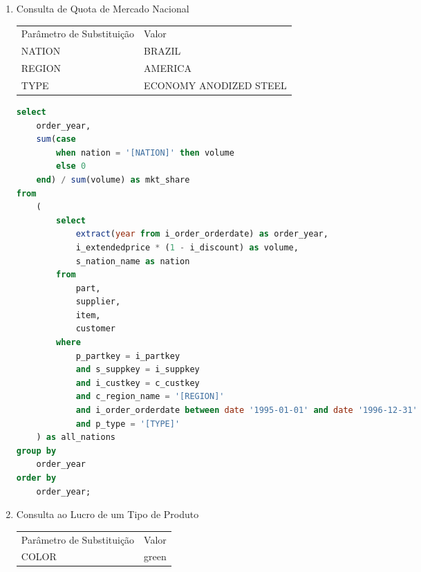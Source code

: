 \begin{enumerate}
	\begin{lstlisting}[language=SQL]
select
	supp_nation,
	cust_nation,
	i_year,
	sum(volume) as revenue
from
	(
		select
			s_nation_name as supp_nation,
			c_nation_name as cust_nation,
			extract(year from i_shipdate) as i_year,
			i_extendedprice * (1 - i_discount) as volume
		from
			supplier,
			item,
			customer,
		where
			s_suppkey = i_suppkey
			and c_custkey = i_custkey
			and (
				(s_nation_name = '[NATION1]' and c_nation_name = '[NATION2]')
				or (s_nation_name = '[NATION2]' and c_nation_name = '[NATION1]')
			)
			and i_shipdate between date '1995-01-01' and date '1996-12-31'
	) as shipping
group by
	supp_nation,
	cust_nation,
	i_year
order by
	supp_nation,
	cust_nation,
	i_year;
\end{lstlisting}

\item Consulta de Quota de Mercado Nacional

\begin{tabular}{ll}
	Parâmetro de Substituição & Valor\\
	NATION & BRAZIL\\
	REGION & AMERICA\\
	TYPE &  ECONOMY ANODIZED STEEL\\
\end{tabular}

	\begin{lstlisting}[language=SQL]
select
	order_year,
	sum(case
		when nation = '[NATION]' then volume
		else 0
	end) / sum(volume) as mkt_share
from
	(
		select
			extract(year from i_order_orderdate) as order_year,
			i_extendedprice * (1 - i_discount) as volume,
			s_nation_name as nation
		from
			part,
			supplier,
			item,
			customer
		where
			p_partkey = i_partkey
			and s_suppkey = i_suppkey
			and i_custkey = c_custkey
			and c_region_name = '[REGION]'
			and i_order_orderdate between date '1995-01-01' and date '1996-12-31'
			and p_type = '[TYPE]'
	) as all_nations
group by
	order_year
order by
	order_year;
	\end{lstlisting}

\item Consulta ao Lucro de um Tipo de Produto

\begin{tabular}{ll}
	Parâmetro de Substituição & Valor\\
	COLOR & green\\
\end{tabular}


\end{enumerate}
